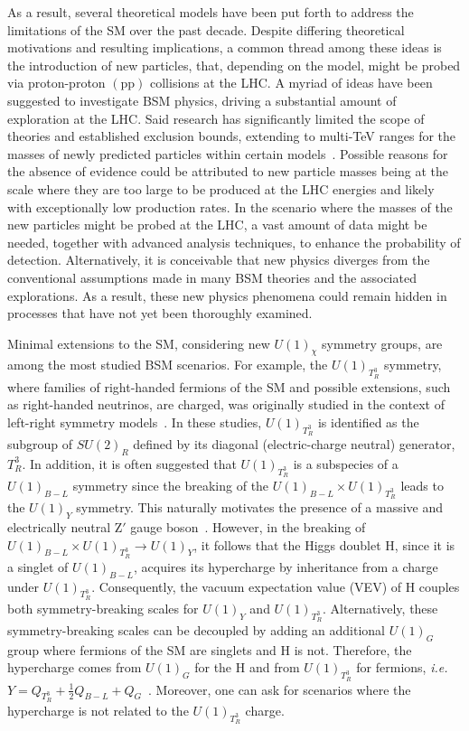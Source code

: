 As a result, several theoretical models have been put forth to address the limitations of the SM over the past decade. Despite differing theoretical motivations and resulting implications, a common thread among these ideas is the introduction of new particles, that, depending on the model, might be probed via proton-proton $(\mathrm{pp})$ collisions at the  LHC. A myriad of ideas have been suggested to investigate BSM physics, driving a substantial amount of exploration at the LHC. Said research has significantly limited the scope of theories and established exclusion bounds, extending to multi-\textrm{TeV} ranges for the masses of newly predicted particles within certain models~\parencite{ParticleDataGroup:2024cfk, CMS:2018iye, CMS:2016ucr, CMS:2016xbv, CMS:2016fxb, CMS:2017xcw, CMS:2015jsu}. Possible reasons for the absence of evidence could be attributed to new particle masses being at the scale where they are too large to be produced at the LHC energies and likely with exceptionally low production rates. In the scenario where the masses of the new particles might be probed at the LHC, a vast amount of data might be needed, together with advanced analysis techniques, to enhance the probability of detection. Alternatively, it is conceivable that new physics diverges from the conventional assumptions made in many BSM theories and the associated explorations. As a result, these new physics phenomena could remain hidden in processes that have not yet been thoroughly examined.


Minimal extensions to the SM, considering new $U(1)_{\chi}$ symmetry groups, are among the most studied BSM scenarios. For example, the  $U(1)_{T^3_R}$ symmetry, where families of right-handed fermions of the SM and possible extensions, such as right-handed neutrinos, are charged, was originally studied in the context of left-right symmetry models~\parencite{PatiSalam1974, MohapatraPati1975, SenjanovicMohapatra1975}. In these studies, $U(1)_{T^3_R}$ is identified as the subgroup of $SU(2)_R$ defined by its diagonal (electric-charge neutral) generator, $T^3_R$. In addition, it is often suggested that  $U(1)_{T^3_R}$ is a subspecies of a $U(1)_{B-L}$ symmetry since the breaking of the $U(1)_{B-L} \times U(1)_{T^3_R}$ leads to the $ U(1)_Y$ symmetry. This naturally motivates the presence of a massive and electrically neutral $\textrm{Z}'$ gauge boson~\parencite{DiLuzio2018, Baker2019, Michaels:2020fzj, Dev:2021otb, Florez2023}. However, in the breaking of  $U(1)_{B-L} \times U(1)_{T^3_R} \rightarrow U(1)_Y$, it follows that the Higgs doublet $\mathrm{H}$, since it is a singlet of $U(1)_{B-L}$,  acquires its hypercharge by inheritance from a charge under $U(1)_{T^3_R}$. Consequently, the vacuum expectation value (VEV) of $\mathrm{H}$  couples both symmetry-breaking scales for $U(1)_Y$ and $U(1)_{T^3_R}$. Alternatively, these symmetry-breaking scales can be decoupled by adding an additional $U(1)_G$ group where fermions of the SM are singlets and $\mathrm{H}$ is not. Therefore, the hypercharge comes from $U(1)_G$ for the $\mathrm{H}$ and from $U(1)_{T^3_R}$ for fermions, \textit{i.e.} $Y=Q_{T^3_R}+\frac{1}{2}Q_{B-L} + Q_G$~\parencite{Dutta:2022qvn}. Moreover, one can ask for scenarios where the hypercharge is not related to the $U(1)_{T^{3}_{R}}$ charge. 

